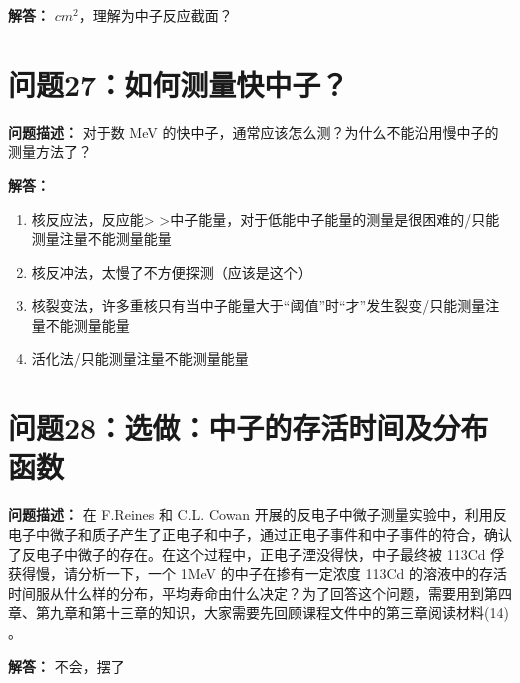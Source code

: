 \documentclass{article}
\begin{document}
\textbf{解答：} $cm^2$，理解为中子反应截面？

\section{问题27：如何测量快中子？}
\label{sec:prob27}

\textbf{问题描述：} 对于数 MeV 的快中子，通常应该怎么测？为什么不能沿用慢中子的测量方法了？

\textbf{解答：}

\begin{enumerate}
    \item 核反应法，反应能> >中子能量，对于低能中子能量的测量是很困难的/只能测量注量不能测量能量
    \item 核反冲法，太慢了不方便探测（应该是这个）
    \item 核裂变法，许多重核只有当中子能量大于“阈值”时“才”发生裂变/只能测量注量不能测量能量
    \item 活化法/只能测量注量不能测量能量
\end{enumerate}

\section*{问题28：选做：中子的存活时间及分布函数}
\label{sec:prob28}

\textbf{问题描述：} 在 F.Reines 和 C.L. Cowan 开展的反电子中微子测量实验中，利用反电子中微子和质子产生了正电子和中子，通过正电子事件和中子事件的符合，确认了反电子中微子的存在。在这个过程中，正电子湮没得快，中子最终被 113Cd 俘获得慢，请分析一下，一个 1MeV 的中子在掺有一定浓度 113Cd 的溶液中的存活时间服从什么样的分布，平均寿命由什么决定？为了回答这个问题，需要用到第四章、第九章和第十三章的知识，大家需要先回顾课程文件中的第三章阅读材料(14) 。

\textbf{解答：} 不会，摆了
\end{document}
